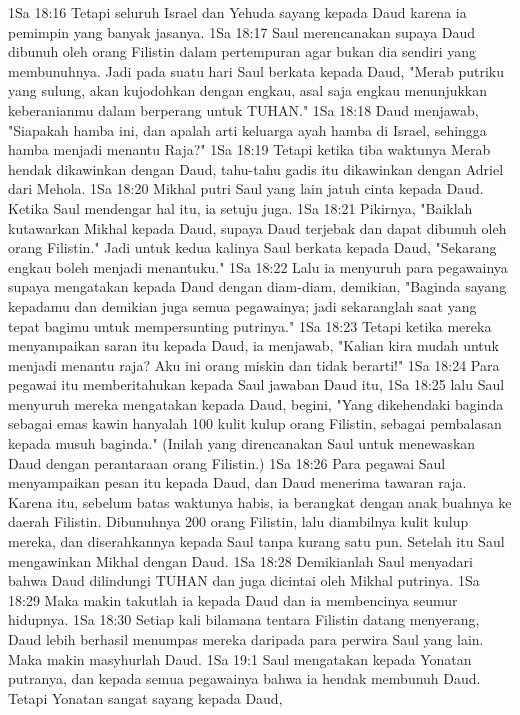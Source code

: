 1Sa 18:16  Tetapi seluruh Israel dan Yehuda sayang kepada Daud karena ia pemimpin yang banyak jasanya.
1Sa 18:17  Saul merencanakan supaya Daud dibunuh oleh orang Filistin dalam pertempuran agar bukan dia sendiri yang membunuhnya. Jadi pada suatu hari Saul berkata kepada Daud, "Merab putriku yang sulung, akan kujodohkan dengan engkau, asal saja engkau menunjukkan keberanianmu dalam berperang untuk TUHAN."
1Sa 18:18  Daud menjawab, "Siapakah hamba ini, dan apalah arti keluarga ayah hamba di Israel, sehingga hamba menjadi menantu Raja?"
1Sa 18:19  Tetapi ketika tiba waktunya Merab hendak dikawinkan dengan Daud, tahu-tahu gadis itu dikawinkan dengan Adriel dari Mehola.
1Sa 18:20  Mikhal putri Saul yang lain jatuh cinta kepada Daud. Ketika Saul mendengar hal itu, ia setuju juga.
1Sa 18:21  Pikirnya, "Baiklah kutawarkan Mikhal kepada Daud, supaya Daud terjebak dan dapat dibunuh oleh orang Filistin." Jadi untuk kedua kalinya Saul berkata kepada Daud, "Sekarang engkau boleh menjadi menantuku."
1Sa 18:22  Lalu ia menyuruh para pegawainya supaya mengatakan kepada Daud dengan diam-diam, demikian, "Baginda sayang kepadamu dan demikian juga semua pegawainya; jadi sekaranglah saat yang tepat bagimu untuk mempersunting putrinya."
1Sa 18:23  Tetapi ketika mereka menyampaikan saran itu kepada Daud, ia menjawab, "Kalian kira mudah untuk menjadi menantu raja? Aku ini orang miskin dan tidak berarti!"
1Sa 18:24  Para pegawai itu memberitahukan kepada Saul jawaban Daud itu,
1Sa 18:25  lalu Saul menyuruh mereka mengatakan kepada Daud, begini, "Yang dikehendaki baginda sebagai emas kawin hanyalah 100 kulit kulup orang Filistin, sebagai pembalasan kepada musuh baginda." (Inilah yang direncanakan Saul untuk menewaskan Daud dengan perantaraan orang Filistin.)
1Sa 18:26  Para pegawai Saul menyampaikan pesan itu kepada Daud, dan Daud menerima tawaran raja. Karena itu, sebelum batas waktunya habis, ia berangkat dengan anak buahnya ke daerah Filistin. Dibunuhnya 200 orang Filistin, lalu diambilnya kulit kulup mereka, dan diserahkannya kepada Saul tanpa kurang satu pun. Setelah itu Saul mengawinkan Mikhal dengan Daud.
1Sa 18:28  Demikianlah Saul menyadari bahwa Daud dilindungi TUHAN dan juga dicintai oleh Mikhal putrinya.
1Sa 18:29  Maka makin takutlah ia kepada Daud dan ia membencinya seumur hidupnya.
1Sa 18:30  Setiap kali bilamana tentara Filistin datang menyerang, Daud lebih berhasil menumpas mereka daripada para perwira Saul yang lain. Maka makin masyhurlah Daud.
1Sa 19:1  Saul mengatakan kepada Yonatan putranya, dan kepada semua pegawainya bahwa ia hendak membunuh Daud. Tetapi Yonatan sangat sayang kepada Daud,
